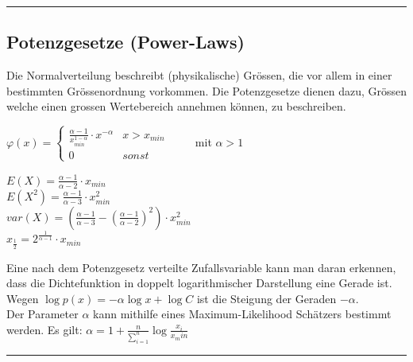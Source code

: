   \hrule 
      
	\subsection{Potenzgesetze (Power-Laws) \skript{\pageref{sk-potenzgesetze}}}
	Die Normalverteilung beschreibt (physikalische) Grössen, die vor allem in einer bestimmten
	Grössenordnung vorkommen. Die Potenzgesetze dienen dazu, Grössen welche einen grossen
	Wertebereich annehmen können, zu beschreiben.
	
    \begin{multicols}{2}
		$\varphi(x) = \begin{cases}
		\frac{\alpha - 1}{x_{min}^{1-\alpha}}\cdot x^{-\alpha} & x > x_{min} \\
		0 & sonst
		\end{cases} \qquad $ mit $\alpha > 1$\\
		
    \columnbreak
    
		$E(X) = \frac{\alpha - 1}{\alpha - 2} \cdot x_{min}$ \\
		$E(X^2) = \frac{\alpha - 1}{\alpha - 3} \cdot x_{min}^2$ \\
 		$var(X) = \left(\frac{\alpha - 1}{\alpha - 3} - \left(\frac{\alpha -1}{\alpha -2}\right)^2\right)\cdot x_{min}^2$ \\
 		$x_{\frac{1}{2}} = 2^{\frac{1}{\alpha - 1}} \cdot x_{min}$ \\
	\end{multicols}
	
	Eine nach dem Potenzgesetz verteilte Zufallsvariable kann man daran erkennen, dass die Dichtefunktion in doppelt logarithmischer Darstellung eine Gerade ist. Wegen
	$\log p(x) = -\alpha \log x + \log C$ ist die Steigung der Geraden $-\alpha$. \\
	
	Der Parameter $\alpha$ kann mithilfe eines Maximum-Likelihood Schätzers bestimmt werden. Es gilt: $\alpha = 1 + \frac{n}{\sum_{i=1}^{n}} \log \frac{x_i}{x_min}$ \\
\hrule
